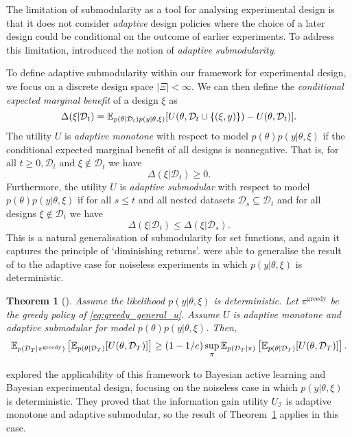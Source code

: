 \documentclass[a4paper, 10pt]{report}
\theoremstyle{plain}
\newtheorem{theorem}{Theorem}[chapter]
\begin{document}
	The limitation of submodularity as a tool for analysing experimental design is that it does not consider \emph{adaptive} design policies where the choice of a later design could be conditional on the outcome of earlier experiments.
	To address this limitation, \citet{golovin2011adaptive} introduced the notion of \emph{adaptive submodularity}.
	
	To define adaptive submodularity within our framework for experimental design, %
	we focus on a discrete design space $|\Xi|<\infty$.
	We can then define the \emph{conditional expected marginal benefit} of a design $\xi$ as
	\begin{equation}
	\Delta(\xi|\mathcal{D}_t) = \mathbb{E}_{p(\theta|\mathcal{D}_t)p(y|\theta,\xi)}[U(\theta,\mathcal{D}_t \cup \{ (\xi,y) \}) - U(\theta,\mathcal{D}_t)].
	\end{equation}
	The utility $U$ is \emph{adaptive monotone} with respect to model $p(\theta)p(y|\theta,\xi)$ if the conditional expected marginal benefit of all designs is nonnegative. That is, for all $t\ge 0, \mathcal{D}_t$ and $\xi\not\in\mathcal{D}_t$ we have 
	\begin{equation}
	\Delta(\xi|\mathcal{D}_t) \ge 0.
	\end{equation}
	Furthermore, the utility $U$ is \emph{adaptive submodular} with respect to model $p(\theta)p(y|\theta,\xi)$ if for all $s \le t$ and all nested datasets $\mathcal{D}_s \subseteq \mathcal{D}_t$ and for all designs $\xi \not\in \mathcal{D}_t$ we have
	\begin{equation}
	\Delta(\xi|\mathcal{D}_t) \le \Delta(\xi|\mathcal{D}_s).
	\end{equation}
	This is a natural generalisation of submodularity for set functions, and again it captures the principle of `diminishing returns'.
	\citet{golovin2011adaptive} were able to generalise the result of \citet{nemhauser1978analysis} to the adaptive case for noiseless experiments in which $p(y|\theta,\xi)$ is deterministic.
	\begin{theorem}[\citet{golovin2011adaptive}]
		\label{thm:adaptive_submodular}
		Assume the likelihood $p(y|\theta,\xi)$ is deterministic.
		Let $\pi^\text{greedy}$ be the greedy policy of \eqref{eq:greedy_general_u}. Assume $U$ is adaptive monotone and adaptive submodular for model $p(\theta)p(y|\theta,\xi)$.
		Then,
		\begin{equation}
		\mathbb{E}_{p(\mathcal{D}_T|\pi^\text{greedy})}\left[ \mathbb{E}_{p(\theta|\mathcal{D}_T)}[U(\theta,\mathcal{D}_T)] \right] \ge \left(1 - 1/e \right)\sup_\pi \mathbb{E}_{p(\mathcal{D}_T|\pi)}\left[ \mathbb{E}_{p(\theta|\mathcal{D}_T)}[U(\theta,\mathcal{D}_T)] \right].
		\end{equation}
	\end{theorem}
	\citet{golovin2010} explored the applicability of this framework to Bayesian active learning and Bayesian experimental design, focusing on the noiseless case in which $p(y|\theta,\xi)$ is deterministic.
	They proved that the information gain utility $U_\mathcal{I}$ is adaptive monotone and adaptive submodular, so the result of Theorem~\ref{thm:adaptive_submodular} applies in this case.
	
\end{document}
